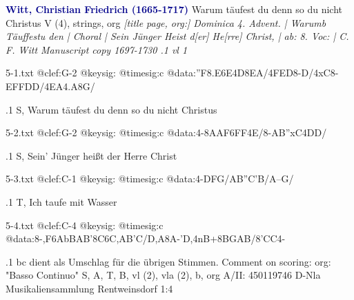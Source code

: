 \documentclass[twocolumn]{book}
\begin{document}
\newline \textcolor{darkblue}{\textbf{Witt, Christian Friedrich (1665-1717)
}}
\newline Warum täufest du denn so du nicht Christus
\newline V (4), strings, org
\newline \itshape [title page, org:] Dominica 4. Advent. | Warumb Täuffestu den | Choral | Sein Jünger Heist d[er] He[rre] Christ, | ab: 8. Voc: | C. F. Witt \normalfont 
\newline \textcolor{darkblue}{} Manuscript copy 1697-1730
.1 vl 1
\newline
\begin{filecontents*}{5-1.txt}
@clef:G-2
@keysig:
@timesig:c
@data:''F{8.E6E}4D8{EA}/4FED8-D/4xC8-E{FFDD}/4EA4.A8G/
\end{filecontents*}
\immediate{}
%
.1 S, Warum täufest du denn so du nicht Christus
\newline
\begin{filecontents*}{5-2.txt}
@clef:G-2
@keysig:
@timesig:c
@data:4-8AAF6FF4E/8-AB''xC4DD/
\end{filecontents*}
\immediate{}
%
.1 S, Sein' Jünger heißt der Herre Christ
\newline
\begin{filecontents*}{5-3.txt}
@clef:C-1
@keysig:
@timesig:c
@data:4-DFG/AB''C'B/A--G/
\end{filecontents*}
\immediate{}
%
.1 T, Ich taufe mit Wasser
\newline
\begin{filecontents*}{5-4.txt}
@clef:C-4
@keysig:
@timesig:c
@data:8-,F6{AbBAB}'{8C6C,AB'C}/{D,A}8A-'D,4nB+{8BGAB}/8'CC4-
\end{filecontents*}
\immediate{}
%
.1
\newline bc dient als Umschlag für die übrigen Stimmen.
\newline Comment on scoring: org: "Basso Continuo"
\newline S, A, T, B, vl (2), vla (2), b, org
\newline A/II: 450119746
\newline D-Nla Musikaliensammlung Rentweinsdorf 1:4
\newline 
\end{document}
